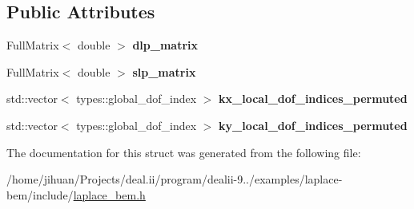 \subsection*{Public Attributes}
\begin{DoxyCompactItemize}
\item 
\mbox{\label{structLaplaceBEM_1_1PairCellWisePerTaskData_a35b4a45b92bf0c8c36107fdc80c966cb}} 
Full\+Matrix$<$ double $>$ {\bfseries dlp\+\_\+matrix}
\item 
\mbox{\label{structLaplaceBEM_1_1PairCellWisePerTaskData_aa96b7a6991e47201c7f1f6a9fdfa8680}} 
Full\+Matrix$<$ double $>$ {\bfseries slp\+\_\+matrix}
\item 
\mbox{\label{structLaplaceBEM_1_1PairCellWisePerTaskData_ad258060f7c6dfce99a40508320bb54bc}} 
std\+::vector$<$ types\+::global\+\_\+dof\+\_\+index $>$ {\bfseries kx\+\_\+local\+\_\+dof\+\_\+indices\+\_\+permuted}
\item 
\mbox{\label{structLaplaceBEM_1_1PairCellWisePerTaskData_a4ebad8073a36303fd26b67acd9a0d9b8}} 
std\+::vector$<$ types\+::global\+\_\+dof\+\_\+index $>$ {\bfseries ky\+\_\+local\+\_\+dof\+\_\+indices\+\_\+permuted}
\end{DoxyCompactItemize}


The documentation for this struct was generated from the following file\+:\begin{DoxyCompactItemize}
\item 
/home/jihuan/\+Projects/deal.\+ii/program/dealii-\/9../examples/laplace-\/bem/include/\hyperlink{laplace__bem_8h}{laplace\+\_\+bem.\+h}\end{DoxyCompactItemize}

